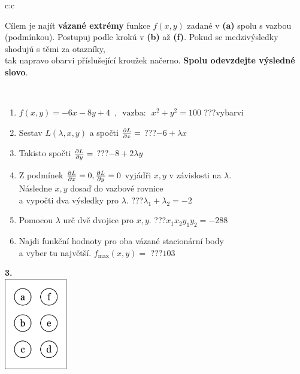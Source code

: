 \documentclass[10pt]{report}
\begin{document}
\begin{tabular}{c:c}
\begin{minipage}[c][104.5mm][t]{0.5\linewidth}
\begin{center}
\begin{minipage}{0.95\linewidth}
\begin{center}
Cílem je najít \textbf{vázané extrémy} funkce $f(x,y)$ zadané v \textbf{(a)} spolu s vazbou (podmínkou). Postupuj podle krokú v \textbf{(b)} až \textbf{(f)}. Pokud se medzivýsledky shodujú s těmi za otazníky,\\tak napravo obarvi příslušející kroužek načerno. \textbf{Spolu odevzdejte výsledné slovo}.
\end{center}
\end{minipage}
\\[1mm]
\begin{minipage}{0.79\linewidth}
\begin{center}
\begin{varwidth}{\linewidth}
\begin{enumerate}
\normalsize
\item $f(x,y)=-6x-8y+4 \enspace , \enspace \mathrm{vazba:} \enspace x^2+y^2=100$\quad \dotfill\; ???\;\dotfill \quad vybarvi
\item Sestav $L(\lambda,x,y)$ a spočti $\pdv{L}{x}=$\quad \dotfill\; ???\;\dotfill \quad $-6+\lambda x$
\item Takisto spočti $\pdv{L}{y}=$\quad \dotfill\; ???\;\dotfill \quad $-8+2\lambda y$
\item Z podmínek $\pdv{L}{x}=0 , \pdv{L}{y}=0$ vyjádři $x,y$ v závislosti na $\lambda$.\\ \phantom{xxxxxx}Následne $x,y$ dosaď do vazbové rovnice\\ \phantom{xxxxxx}a vypočti dva výsledky pro $\lambda$.\quad \dotfill\; ???\;\dotfill \quad $\lambda_1+\lambda_2=-2$
\item Pomocou $\lambda$ urč dvě dvojice pro $x,y$.\quad \dotfill\; ???\;\dotfill \quad $x_1 x_2 y_1 y_2=-288$
\item Najdi funkční hodnoty pro oba vázané stacionární body\\ \phantom{xxxxxx}a vyber tu najvětší. $f_{\text{max}}(x,y)=$\quad \dotfill\; ???\;\dotfill \quad $103$
\end{enumerate}
\end{varwidth}
\end{center}
\end{minipage}
\begin{minipage}{0.20\linewidth}
\begin{center}
{\Huge\bfseries 3.} \\[2mm]
\includegraphics[height=40mm]{../images/braille.png}

\end{center}
\end{minipage}
\end{center}
\end{minipage}
\end{tabular}
\end{document}
